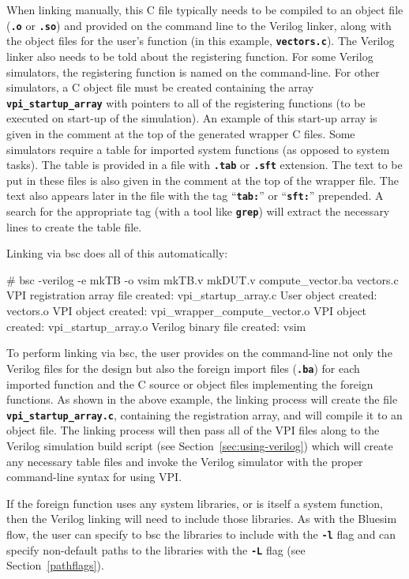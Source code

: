 \documentclass{article}
\newcommand{\te}[1]{\texttt{#1}}
\newenvironment{centerboxverbatim}
  {\center
   \boxedverbatim}
  {\endboxedverbatim
  {\endcenter }}
\begin{document}
When linking manually, this C file typically needs to be compiled to
an object file ({\bf\tt .o} or {\bf\tt .so}) and provided on the
command line to the Verilog linker, along with the object files for
the user's function (in this example, {\bf\tt vectors.c}).  The
Verilog linker also needs to be told about the registering function.
For some Verilog simulators, the registering function is named on the
command-line.  For other simulators, a C object file must be created
containing the array {\bf\tt vpi\_startup\_array} with pointers to all
of the registering functions (to be executed on start-up of the
simulation).  An example of this start-up array is given in the comment
at the top of the generated wrapper C files.  Some simulators require
a table for imported system functions (as opposed to system tasks).
The table is provided in a file with {\bf\tt .tab} or {\bf\tt .sft}
extension.  The text to be put in these files is also given in the
comment at the top of the wrapper file.  The text also appears later
in the file with the tag ``{\bf\tt tab:}'' or ``{\bf\tt sft:}''
prepended.  A search for the appropriate tag (with a tool like {\bf\tt grep})
will extract the necessary lines to create the table file.

Linking via bsc does all of this automatically:

\begin{centerboxverbatim}
# bsc -verilog -e mkTB -o vsim mkTB.v mkDUT.v compute_vector.ba vectors.c
VPI registration array file created: vpi_startup_array.c
User object created: vectors.o
VPI object created: vpi_wrapper_compute_vector.o
VPI object created: vpi_startup_array.o
Verilog binary file created: vsim
\end{centerboxverbatim}

To perform linking via bsc, the user provides on the command-line not
only the Verilog files for the design but also the foreign import files
({\bf\tt .ba}) for each imported function and the C source or object files
implementing the foreign functions.  As shown in the above example,
the linking process will create the file {\bf\tt vpi\_startup\_array.c},
containing the registration array, and will compile it to an object file.
The linking process will then pass all of the VPI files along to the
Verilog simulation build script (see Section~\ref{sec:using-verilog})
which will create any necessary table files and invoke the Verilog
simulator with the proper command-line syntax for using VPI.

If the foreign function uses any system libraries, or is itself a
system function, then the Verilog linking will need to include those
libraries.  As with the Bluesim flow, the user can specify to bsc
the libraries to include with the {\bf\tt -l} flag and can specify
non-default paths to the libraries with the {\bf\tt -L} flag
(see Section~\ref{pathflags}).\index{-L@\te{-L} (compiler flag)}
\index{-l@\te{-l} (compiler flag)}
\end{document}
